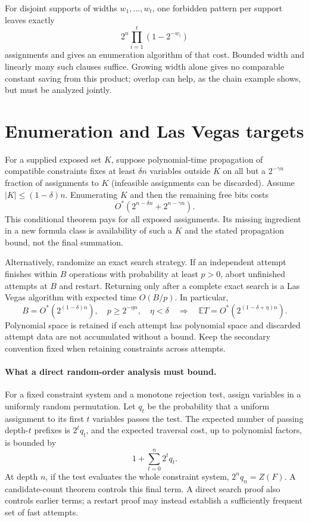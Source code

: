 \documentclass[11pt,a4paper]{article}
\theoremstyle{remark}
\newcommand{\Ostar}{O^{*}}
\newcommand{\E}{\mathbb E}
\begin{document}
For disjoint supports of widths $w_1,\ldots,w_t$, one forbidden pattern
per support leaves exactly
\[
 2^n\prod_{i=1}^t(1-2^{-w_i})
\]
assignments and gives an enumeration algorithm of that cost. Bounded
width and linearly many such clauses suffice. Growing width alone gives
no comparable constant saving from this product; overlap can help, as
the chain example shows, but must be analyzed jointly.

\section{Enumeration and Las Vegas targets}

For a supplied exposed set $K$, suppose polynomial-time propagation of
compatible constraints fixes at least $\delta n$ variables outside $K$
on all but a $2^{-\gamma n}$ fraction of assignments to $K$ (infeasible
assignments can be discarded). Assume $|K|\le(1-\delta)n$.
Enumerating $K$ and then the remaining free bits costs
\begin{equation}
 \Ostar\left(2^{n-\delta n}+2^{n-\gamma n}\right). \label{eq:exposure}
\end{equation}
This conditional theorem pays for all exposed assignments. Its missing
ingredient in a new formula class is availability of such a $K$ and the
stated propagation bound, not the final summation.

Alternatively, randomize an exact search strategy. If an independent
attempt finishes within $B$ operations with probability at least $p>0$,
abort unfinished attempts at $B$ and restart. Returning only after a
complete exact search is a Las Vegas algorithm with expected time
$O(B/p)$. In particular,
\[
 B=\Ostar(2^{(1-\delta)n}),\quad p\ge2^{-\eta n},\quad \eta<\delta
 \quad\Longrightarrow\quad
 \E T=\Ostar(2^{(1-\delta+\eta)n}).
\]
Polynomial space is retained if each attempt has polynomial space and
discarded attempt data are not accumulated without a bound. Keep the
secondary convention fixed when retaining constraints across attempts.

\paragraph{What a direct random-order analysis must bound.}
For a fixed constraint system and a monotone rejection test, assign
variables in a uniformly random permutation. Let $q_t$ be the probability
that a uniform assignment to its first $t$ variables passes the test.
The expected number of passing depth-$t$ prefixes is $2^tq_t$, and the
expected traversal cost, up to polynomial factors, is bounded by
\[
 1+\sum_{t=0}^n2^tq_t.
\]
At depth $n$, if the test evaluates the whole constraint system,
$2^nq_n=Z(F)$. A candidate-count theorem controls this final term.
A direct search proof also controls earlier terms; a restart proof may
instead establish a sufficiently frequent set of fast attempts.
\end{document}
